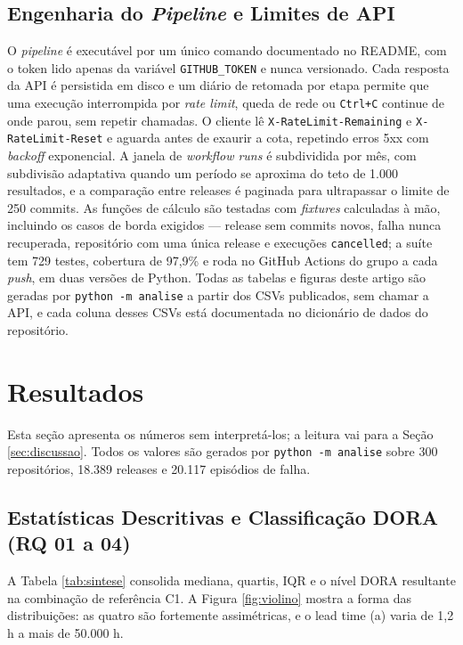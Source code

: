 \subsection{Engenharia do \emph{Pipeline} e Limites de API}

O \emph{pipeline} é executável por um único comando documentado no README, com o token lido
apenas da variável \texttt{GITHUB\_TOKEN} e nunca versionado. Cada resposta da API é
persistida em disco e um diário de retomada por etapa permite que uma execução interrompida
por \emph{rate limit}, queda de rede ou \texttt{Ctrl+C} continue de onde parou, sem repetir
chamadas. O cliente lê \texttt{X-RateLimit-Remaining} e \texttt{X-RateLimit-Reset} e aguarda
antes de exaurir a cota, repetindo erros 5xx com \emph{backoff} exponencial. A janela de
\emph{workflow runs} é subdividida por mês, com subdivisão adaptativa quando um período se
aproxima do teto de 1.000 resultados, e a comparação entre releases é paginada para
ultrapassar o limite de 250 commits. As funções de cálculo são testadas com \emph{fixtures}
calculadas à mão, incluindo os casos de borda exigidos --- release sem commits novos, falha
nunca recuperada, repositório com uma única release e execuções \texttt{cancelled}; a suíte
tem 729 testes, cobertura de 97,9\% e roda no GitHub Actions do grupo a cada \emph{push}, em
duas versões de Python. Todas as tabelas e figuras deste artigo são geradas por
\texttt{python -m analise} a partir dos CSVs publicados, sem chamar a API, e cada coluna
desses CSVs está documentada no dicionário de dados do repositório.

\section{Resultados}
\label{sec:resultados}

Esta seção apresenta os números sem interpretá-los; a leitura vai para a Seção
\ref{sec:discussao}. Todos os valores são gerados por \texttt{python -m analise} sobre 300
repositórios, 18.389 releases e 20.117 episódios de falha.

\subsection{Estatísticas Descritivas e Classificação DORA (RQ 01 a 04)}

A Tabela \ref{tab:sintese} consolida mediana, quartis, IQR e o nível DORA resultante na
combinação de referência C1. A Figura \ref{fig:violino} mostra a forma das distribuições: as
quatro são fortemente assimétricas, e o lead time (a) varia de 1,2 h a mais de 50.000 h.


